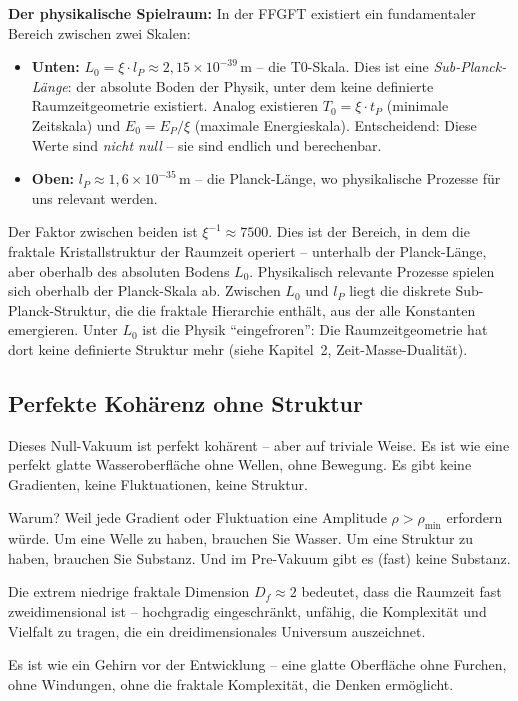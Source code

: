 	\textbf{Der physikalische Spielraum:} In der FFGFT existiert ein fundamentaler Bereich zwischen zwei Skalen:
	\begin{itemize}[leftmargin=*]
		\item \textbf{Unten:} $L_0 = \xi \cdot l_P \approx 2{,}15 \times 10^{-39}\,$m -- die T0-Skala. Dies ist eine \textit{Sub-Planck-Länge}: der absolute Boden der Physik, unter dem keine definierte Raumzeitgeometrie existiert. Analog existieren $T_0 = \xi \cdot t_P$ (minimale Zeitskala) und $E_0 = E_P / \xi$ (maximale Energieskala). Entscheidend: Diese Werte sind \textit{nicht null} -- sie sind endlich und berechenbar.
		\item \textbf{Oben:} $l_P \approx 1{,}6 \times 10^{-35}\,$m -- die Planck-Länge, wo physikalische Prozesse für uns relevant werden.
	\end{itemize}
	Der Faktor zwischen beiden ist $\xi^{-1} \approx 7500$. Dies ist der Bereich, in dem die fraktale Kristallstruktur der Raumzeit operiert -- unterhalb der Planck-Länge, aber oberhalb des absoluten Bodens $L_0$. Physikalisch relevante Prozesse spielen sich oberhalb der Planck-Skala ab. Zwischen $L_0$ und $l_P$ liegt die diskrete Sub-Planck-Struktur, die die fraktale Hierarchie enthält, aus der alle Konstanten emergieren. Unter $L_0$ ist die Physik \enquote{eingefroren}: Die Raumzeitgeometrie hat dort keine definierte Struktur mehr (siehe Kapitel~2, Zeit-Masse-Dualität).
	
	\subsection{Perfekte Kohärenz ohne Struktur}
	
	Dieses Null-Vakuum ist perfekt kohärent -- aber auf triviale Weise. Es ist wie eine perfekt glatte Wasseroberfläche ohne Wellen, ohne Bewegung. Es gibt keine Gradienten, keine Fluktuationen, keine Struktur.
	
	Warum? Weil jede Gradient oder Fluktuation eine Amplitude $\rho > \rho_{\min}$ erfordern würde. Um eine Welle zu haben, brauchen Sie Wasser. Um eine Struktur zu haben, brauchen Sie Substanz. Und im Pre-Vakuum gibt es (fast) keine Substanz.
	
	Die extrem niedrige fraktale Dimension $D_f \approx 2$ bedeutet, dass die Raumzeit fast zweidimensional ist -- hochgradig eingeschränkt, unfähig, die Komplexität und Vielfalt zu tragen, die ein dreidimensionales Universum auszeichnet.
	
	Es ist wie ein Gehirn vor der Entwicklung -- eine glatte Oberfläche ohne Furchen, ohne Windungen, ohne die fraktale Komplexität, die Denken ermöglicht.
	
